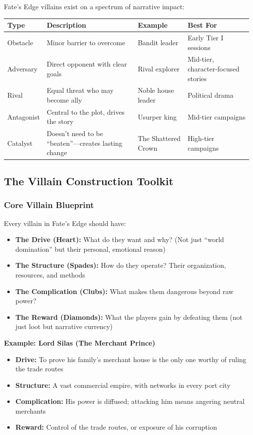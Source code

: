 \documentclass[10pt]{article}
\begin{document}
Fate's Edge villains exist on a spectrum of narrative impact:

\begin{center}
\begin{tabular}{|p{}|p{}|p{}|p{}|}
\hline
\textbf{Type} & \textbf{Description} & \textbf{Example} & \textbf{Best For} \\ \hline
Obstacle & Minor barrier to overcome & Bandit leader & Early Tier I sessions \\ \hline
Adversary & Direct opponent with clear goals & Rival explorer & Mid-tier, character-focused stories \\ \hline
Rival & Equal threat who may become ally & Noble house leader & Political drama \\ \hline
Antagonist & Central to the plot, drives the story & Usurper king & Mid-tier campaigns \\ \hline
Catalyst & Doesn't need to be ``beaten''---creates lasting change & The Shattered Crown & High-tier campaigns \\ \hline
\end{tabular}
\end{center}

\subsection{The Villain Construction Toolkit}

\subsubsection{Core Villain Blueprint}

Every villain in Fate's Edge should have:

\begin{itemize}
  \item \textbf{The Drive (Heart):} What do they want and why? (Not just ``world domination'' but their personal, emotional reason)
  \item \textbf{The Structure (Spades):} How do they operate? Their organization, resources, and methods
  \item \textbf{The Complication (Clubs):} What makes them dangerous beyond raw power?
  \item \textbf{The Reward (Diamonds):} What the players gain by defeating them (not just loot but narrative currency)
\end{itemize}

\textbf{Example: Lord Silas (The Merchant Prince)}
\begin{itemize}
  \item \textbf{Drive:} To prove his family's merchant house is the only one worthy of ruling the trade routes
  \item \textbf{Structure:} A vast commercial empire, with networks in every port city
  \item \textbf{Complication:} His power is diffused; attacking him means angering neutral merchants
  \item \textbf{Reward:} Control of the trade routes, or exposure of his corruption
\end{itemize}
\end{document}
